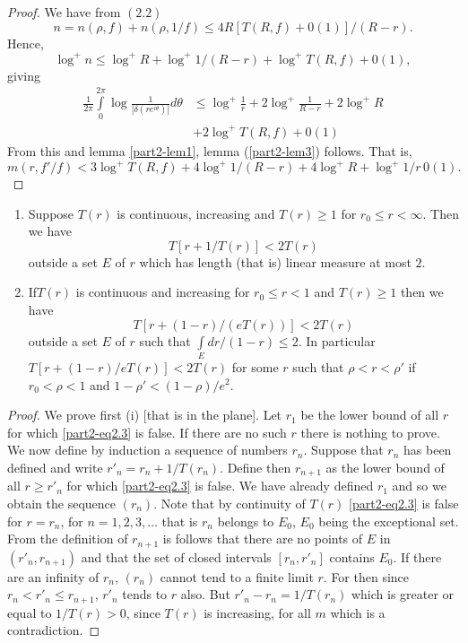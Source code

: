 \begin{proof}
We have from $(2.2)$
$$
n=n(\rho,f)+n(\rho,1/f)\leq 4R[T(R,f)+0(1)]/(R-r).
$$
Hence,
$$
\log^{+}n\leq \log^{+}R+\log^{+}1/(R-r)+\log^{+}T(R,f)+0(1),
$$
giving
\begin{align*}
\frac{1}{2\pi}\int\limits^{2\pi}_{0}\log
\frac{1}{|\delta(re^{i\theta})|}d\theta &\leq
\log^{+}\frac{1}{r}+2\log^{+}\frac{1}{R-r}+2\log^{+}R\\
&+2\log^{+}T(R,f)+0(1)
\end{align*}
From this and lemma \ref{part2-lem1}, lemma (\ref{part2-lem3})
follows. That is,
$$
m(r,f'/f)<3\log^{+}T(R,f)+4\log^{+}1/(R-r)+4\log^{+}R+\log^{+}1/r \,0(1).
$$
\end{proof}

\begin{lem}[Borel]\label{part2-lem4}
\begin{enumerate}
\renewcommand{\theenumi}{\roman{enumi}}
\renewcommand{\labelenumi}{\rm(\theenumi)}
\item Suppose $T(r)$ is continuous, increasing and $T(r)\geq 1$ for
  $r_{0}\leq r<\infty$. Then we have 
\begin{equation*}
T[r+1/T(r)]<2T(r)\tag{2.3}\label{part2-eq2.3}
\end{equation*}
outside a set $E$ of $r$ which has length (that is) linear measure at
most $2$.

\item If\pageoriginale $T(r)$ is continuous and increasing for
  $r_{0}\leq r<1$ and 
  $T(r)\geq 1$ then we have
\begin{equation*}
T[r+(1-r)/(eT(r))]<2T(r)\tag{2.4}\label{part2-eq2.4}
\end{equation*}
outside a set $E$ of $r$ such that $\int\limits_{E}dr/(1-r)\leq 2$. In
particular $T[r+(1-r)/eT(r)]<2T(r)$ for some $r$ such that
$\rho<r<\rho'$ if $r_{0}<\rho<1$ and $1-\rho'<(1-\rho)/e^{2}$.
\end{enumerate}
\end{lem}

\begin{proof}
We prove first (i) [that is in the plane]. Let $r_{1}$ be the lower
bound of all $r$ for which \eqref{part2-eq2.3} is false. If there are
no such $r$ there is nothing to prove. We now define by induction a
sequence of numbers $r_{n}$. Suppose that $r_{n}$ has been defined and
write $r'_{n}=r_{n}+1/T(r_{n})$. Define then $r_{n+1}$ as the lower
bound of all $r\geq r'_{n}$ for which \eqref{part2-eq2.3} is false. We
have already defined $r_{1}$ and so we obtain the sequence
$(r_{n})$. Note that by continuity of $T(r)$ \eqref{part2-eq2.3} is
false for $r=r_{n}$, for $n=1,2,3,\ldots$ that is $r_{n}$ belongs to
$E_{0}$, $E_{0}$ being the exceptional set. From the definition of
$r_{n+1}$ is follows that there are no points of $E$ in
$(r'_{n},r_{n+1})$ and that the set of closed intervals
$[r_{n},r'_{n}]$ contains $E_{0}$. If there are an infinity of
$r_{n}$, $(r_{n})$ cannot tend to a finite limit $r$. For then since
$r_{n}<r'_{n}\leq r_{n+1}$, $r'_{n}$ tends to $r$ also. But
$r'_{n}-r_{n}=1/T(r_{n})$ which is greater or equal to $1/T(r)>0$,
since $T(r)$ is increasing, for all $m$ which is a contradiction.
\end{proof}

